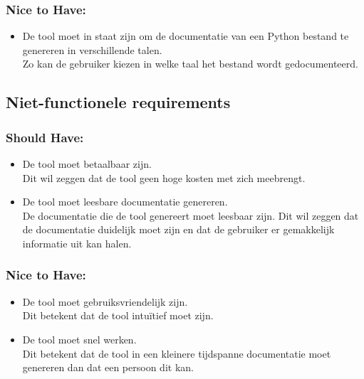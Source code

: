 \subsubsection{Nice to Have:}
\begin{itemize}
    \item De tool moet in staat zijn om de documentatie van een Python bestand te genereren in verschillende talen.\\
    Zo kan de gebruiker kiezen in welke taal het bestand wordt gedocumenteerd.
\end{itemize}

\subsection{Niet-functionele requirements}
\label{sec:niet-functionele-requirements}
\subsubsection{Should Have:}
\begin{itemize}
    \item De tool moet betaalbaar zijn.\\
    Dit wil zeggen dat de tool geen hoge kosten met zich meebrengt.
    \item De tool moet leesbare documentatie genereren.\\
    De documentatie die de tool genereert moet leesbaar zijn. Dit wil zeggen dat de documentatie duidelijk moet zijn en dat de gebruiker er gemakkelijk informatie uit kan halen.    
\end{itemize}

\subsubsection{Nice to Have:}
\begin{itemize}
    \item De tool moet gebruiksvriendelijk zijn.\\
    Dit betekent dat de tool intuïtief moet zijn.
    \item De tool moet snel werken.\\
    Dit betekent dat de tool in een kleinere tijdspanne documentatie moet genereren dan dat een persoon dit kan.
\end{itemize}

